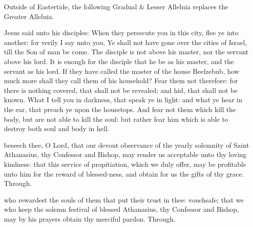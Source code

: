 
\begin{rubric}
	Outside of Eastertide, the following Gradual \& Lesser Alleluia replaces the Greater Alleluia.
\end{rubric}


 Jesus said unto his disciples: When they persecute you in this city, flee ye into another: for verily I say unto you, Ye shall not have gone over the cities of Israel, till the Son of man be come. The disciple is not above his master, nor the servant above his lord. It is enough for the disciple that he be as his master, and the servant as his lord. If they have called the master of the house Beelzebub, how much more shall they call them of his household? Fear them not therefore: for there is nothing covered, that shall not be revealed; and hid, that shall not be known. What I tell you in darkness, that speak ye in light: and what ye hear in the ear, that preach ye upon the housetops. And fear not them which kill the body, but are not able to kill the soul: but rather fear him which is able to destroy both soul and body in hell.


\secret
{} beseech thee, O Lord, that our devout observance of the yearly solemnity of Saint Athanasius, thy Confessor and Bishop, may render us acceptable unto thy loving kindness: that this service of propitiation, which we duly offer, may be profitable unto him for the reward of blessed-ness, and obtain for us the gifts of thy grace. Through.


\postcommunion
{} who rewardest the souls of them that put their trust in thee: vouchsafe; that we who keep the solemn festival of blessed Athanasius, thy Confessor and Bishop, may by his prayers obtain thy merciful pardon. Through.


